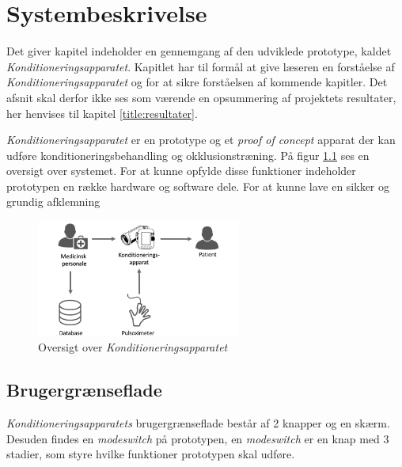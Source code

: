 \chapter{Systembeskrivelse}
Det giver kapitel indeholder en gennemgang af den udviklede prototype, kaldet \textit{Konditioneringsapparatet}. Kapitlet har til formål at give læseren en forståelse af \textit{Konditioneringsapparatet} og for at sikre forståelsen af kommende kapitler. Det afsnit skal derfor ikke ses som værende en opsummering af projektets resultater, her henvises til kapitel \ref{title:resultater}.

\textit{Konditioneringsapparatet} er en prototype og et \textit{proof of concept} apparat der kan udføre konditioneringsbehandling og okklusionstræning. På figur \ref{fig:saelgertegning} ses en oversigt over systemet. For at kunne opfylde disse funktioner indeholder prototypen en række hardware og software dele. For at kunne lave en sikker og grundig afklemning 

\begin{figure}[H]
	\centering
	\includegraphics[width = 0.6\textwidth]{billeder/saelgertegning.png}
	\caption{Oversigt over \textit{Konditioneringsapparatet}} \label{fig:saelgertegning}
\end{figure}

\section{Brugergrænseflade}
\textit{Konditioneringsapparatets} brugergrænseflade består af 2 knapper og en skærm. Desuden findes en \textit{modeswitch} på prototypen, en \textit{modeswitch} er en knap med 3 stadier, som styre hvilke funktioner prototypen skal udføre. 